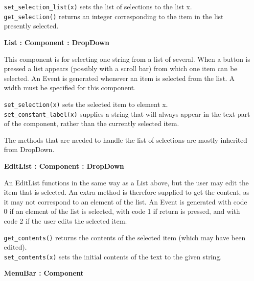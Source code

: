 \texttt{set\_selection\_list(x)} sets the list of selections to the list
x.\\
\texttt{get\_selection()} returns an integer corresponding to the item in the
list presently selected.

{\ttfamily\bfseries
{}List : Component : DropDown}

This component is for selecting one string from a list of several. When
a button is pressed a list appears (possibly with a scroll bar) from
which one item can be selected. An Event is generated whenever an item
is selected from the list. A width must be specified for this
component.

\texttt{set\_selection(x)} sets the selected item to element x.\\
\texttt{set\_constant\_label(x)} supplies a string that will always appear in
the text part of the component, rather than the currently selected item.

The methods that are needed to handle the list of selections are mostly
inherited from DropDown. 


{\ttfamily\bfseries
{}EditList : Component : DropDown}

An EditList functions in the same way as a List above, but the user may
edit the item that is selected. An extra method is therefore supplied
to get the content, as it may not correspond to an element of the list.
An Event is generated with code 0 if an element of the list is
selected, with code 1 if return is pressed, and with code 2 if the user
edits the selected item.

\texttt{get\_contents()} returns the contents of the selected item (which may
have been edited).\\
\texttt{set\_contents(x)} sets the initial contents of the text to the given
string.

{\ttfamily\bfseries
{}MenuBar : Component}

